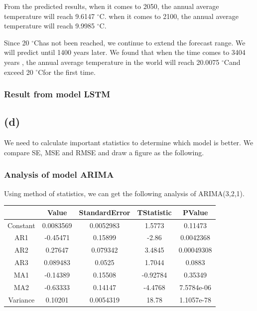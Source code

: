 \documentclass{apmcmthesis}
\def\oc{$^{\circ}$C\;}
\begin{document}
From the predicted results, when it comes to 2050, the annual average temperature will reach 9.6147 \oc. when it comes to 2100, the annual average temperature will reach 9.9985 \oc.

Since 20 \oc has not been reached, we continue to extend the forecast range. We will predict until 1400 years later. We found that when the time comes to 3404 years , the annual average temperature in the world will reach 20.0075 \oc and exceed 20 \oc for the first time.

\subsubsection{Result from model LSTM}


\subsection{(d)}
We need to calculate important statistics to determine which model is better. 
We compare SE, MSE and RMSE and draw a figure as the following.

\subsubsection{Analysis of model ARIMA}

Using method of statistics, we can get the following analysis of ARIMA(3,2,1).

\begin{center}
\begin{tabular}{c|cccc}
  \hline
   &Value& StandardError& TStatistic &PValue\\
  \hline
  Constant  &  0.0083569    &  0.0052983    &     1.5773    &    0.11473\\
    AR{1}    &    -0.45471   &     0.15899  &        -2.86  &    0.0042368\\
    AR{2}    &    0.27647    &   0.079342   &      3.4845   &  0.00049308\\
    AR{3}    &  0.089483     &    0.0525    &     1.7044    &     0.0883\\
    MA{1}   &     -0.14389   &     0.15508  &     -0.92784  &      0.35349\\
    MA{2}    &    -0.63333   &     0.14147  &      -4.4768  &   7.5784e-06\\
    Variance  &    0.10201   &   0.0054319  &        18.78  &   1.1057e-78\\
  \hline
  \end{tabular}
\end{center}
\end{document}
